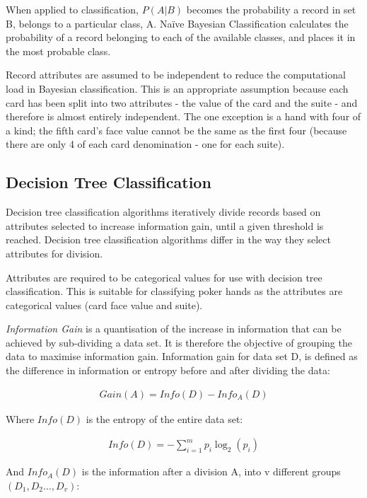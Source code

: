\documentclass[10pt, a4paper]{article}
\begin{document}
When applied to classification, $P(A|B)$ becomes the probability a record in set B, belongs to a particular class, A. Na\"ive Bayesian Classification calculates the probability of a record belonging to each of the available classes, and places it in the most probable class.	

Record attributes are assumed to be independent to reduce the computational load in Bayesian classification. This is an appropriate assumption because each card has been split into two attributes - the value of the card and the suite - and therefore is almost entirely independent. The one exception is a hand with four of a kind; the fifth card's face value cannot be the same as the first four (because there are only 4 of each card denomination - one for each suite).

\subsection*{Decision Tree Classification}

Decision tree classification algorithms iteratively divide records based on attributes selected to increase information gain, until a given threshold is reached. Decision tree classification algorithms differ in the way they select attributes for division.

Attributes are required to be categorical values for use with decision tree classification. This is suitable for classifying poker hands as the attributes are categorical values (card face value and suite).

\textit{Information Gain} is a quantisation of the increase in information that can be achieved by sub-dividing a data set. It is therefore the objective of grouping the data to maximise information gain. Information gain for data set D, is defined as the difference in information or entropy before and after dividing the data:

\begin{align*}
	Gain(A) = Info(D) - Info_A(D)
\end{align*}

Where $Info(D)$ is the entropy of the entire data set:

\begin{align*}
	Info(D) = - \sum^{m}_{i=1}p_i\log_2(p_i)
\end{align*}

And $Info_A(D)$ is the information after a division A, into v different groups $(D_1,  D_2 \ldots, D_v)$:
\end{document}
